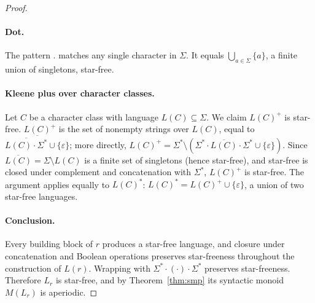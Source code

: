 \documentclass[letterpaper,twocolumn,10pt]{article}
\theoremstyle{definition}
\theoremstyle{remark}
\begin{document}
\begin{proof}
\paragraph{Dot.}
The pattern $.$ matches any single character in $\Sigma$.
It equals $\bigcup_{a \in \Sigma}\{a\}$, a finite union of singletons, star-free.

\paragraph{Kleene plus over character classes.}
Let $C$ be a character class with language $L(C) \subseteq \Sigma$.
We claim $L(C)^+$ is star-free.
$L(C)^+$ is the set of nonempty strings over $L(C)$, equal to
$\overline{\overline{L(C) \cdot \Sigma^*} \cup \{\varepsilon\}}$; more directly,
$L(C)^+ = \Sigma^* \setminus (\Sigma^* \cdot \overline{L(C)} \cdot \Sigma^* \cup \{\varepsilon\})$.
Since $\overline{L(C)} = \Sigma \setminus L(C)$ is a finite set of singletons (hence
star-free), and star-free is closed under complement and concatenation with $\Sigma^*$,
$L(C)^+$ is star-free.
The argument applies equally to $L(C)^*$: $L(C)^* = L(C)^+ \cup \{\varepsilon\}$,
a union of two star-free languages.

\paragraph{Conclusion.}
Every building block of $r$ produces a star-free language, and
closure under concatenation and Boolean operations preserves star-freeness
throughout the construction of $L(r)$.
Wrapping with $\Sigma^* \cdot (\cdot) \cdot \Sigma^*$ preserves star-freeness.
Therefore $L_r$ is star-free, and by Theorem~\ref{thm:smp} its syntactic
monoid $M(L_r)$ is aperiodic.
\end{proof}
\end{document}
